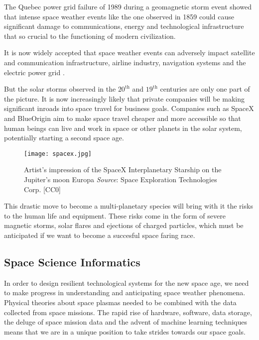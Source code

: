 The Quebec power grid failure of 1989 \citep{kappenman1997geomagnetic} during a geomagnetic storm event showed 
that intense space weather events like the one observed in 1859 could cause significant damage to communications, 
energy and technological infrastructure that so crucial to the functioning of modern civilization.

It is now widely accepted that space weather events can adversely impact satellite and communication infrastructure, 
airline industry, navigation systems and the electric power grid 
\citep{board2009severe,cannon2013extreme,bothmer2007space,baker2004effects}.

But the solar storms observed in the $20^{\text{th}}$ and $19^{\text{th}}$ centuries are only one part of the 
picture. It is now increasingly likely that private companies will be making significant inroads into space 
travel for business goals. Companies such as SpaceX and BlueOrigin aim to make space travel cheaper and more 
accessible so that human beings can live and work in space or other planets in the solar system, potentially 
starting a second space age.


\begin{wrapfigure}{l}{0.4\textwidth}
    \centering\texttt{[image: spacex.jpg]}
    \caption{
        \small Artist's impression of the SpaceX Interplanetary Starship on the Jupiter's moon Europa 
        \textit{Source}: Space Exploration Technologies Corp. [CC0]}
    \label{fig:spacex}
\end{wrapfigure}

This drastic move to become a multi-planetary species will bring with it the risks to the human life and equipment. 
These risks come in the form of severe magnetic storms, solar flares and ejections of charged particles, which must 
be anticipated if we want to become a succesful space faring race. 

\subsection*{Space Science Informatics}

In order to design resilient technological systems for the new space age, we need to make progress in understanding 
and anticipating space weather phenomena. Physical theories about space plasmas needed to be combined with the data 
collected from space missions. The rapid rise of hardware, software, data storage, the deluge of space mission data 
and the advent of machine learning techniques means that we are in a unique position to take strides towards our 
space goals.

